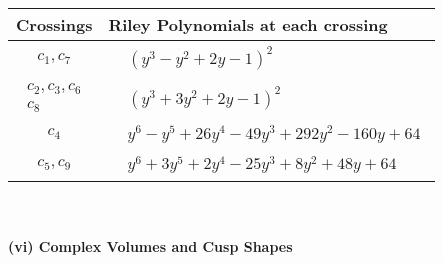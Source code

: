 \documentclass[1p]{elsarticle_modified}
\theoremstyle{definition}
\begin{document}
\begin{tabular}{m{50pt}|m{274pt}}
Crossings & \hspace{64pt}Riley Polynomials at each crossing \\
\hline $$\begin{aligned}c_{1},c_{7}\end{aligned}$$&$\begin{aligned}
&(y^3- y^2+2 y-1)^2
\end{aligned}$\\
\hline $$\begin{aligned}c_{2},c_{3},c_{6}\\c_{8}\end{aligned}$$&$\begin{aligned}
&(y^3+3 y^2+2 y-1)^2
\end{aligned}$\\
\hline $$\begin{aligned}c_{4}\end{aligned}$$&$\begin{aligned}
&y^6- y^5+26 y^4-49 y^3+292 y^2-160 y+64
\end{aligned}$\\
\hline $$\begin{aligned}c_{5},c_{9}\end{aligned}$$&$\begin{aligned}
&y^6+3 y^5+2 y^4-25 y^3+8 y^2+48 y+64
\end{aligned}$\\
\hline
\end{tabular}\\~\\
\newpage\flushleft \textbf{(vi) Complex Volumes and Cusp Shapes}
\end{document}
